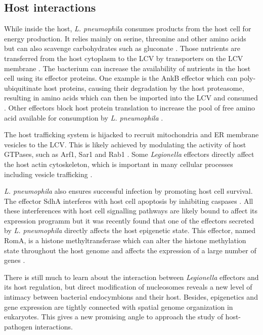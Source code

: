 \subsection{Host interactions}

While inside the host, \textit{L. pneumophila} consumes products from the host cell for energy production. It relies mainly on serine, threonine and other amino acids but can also scavenge carbohydrates such as gluconate \cite{bruggemannVirulenceStrategiesInfecting2006}. Those nutrients are transferred from the host cytoplasm to the LCV by transporters on the LCV membrane \cite{wielandIntracellularMultiplicationLegionella2005}. The bacterium can increase the availability of nutrients in the host cell using its effector proteins. One example is the AnkB effector which can poly-ubiquitinate host proteins, causing their degradation by the host proteasome, resulting in amino acids which can then be imported into the LCV and consumed \cite{priceMolecularMimicryFBox2009}.
Other effectors block host protein translation to increase the pool of free amino acid available for consumption by \textit{L. pneumophila} \cite{leonPositiveNegativeRegulation2017}.

The host trafficking system is hijacked to recruit mitochondria and \acrfull{ER} membrane vesicles to the LCV. This is likely achieved by modulating the activity of host GTPases, such as Arf1, Sar1 and Rab1 \cite{isbergLegionellaPneumophilaReplication2009}. Some \textit{Legionella} effectors directly affect the host actin cytoskeleton, which is important in many cellular processes including vesicle trafficking \citep{liuLegionellaEffectorDisrupts2017,francoLegionellaPneumophilaEffector2012}.

\textit{L. pneumophila} also ensures successful infection by promoting host cell survival. The effector SdhA interferes with host cell apoptosis by inhibiting caspases \cite{lagunaLegionellaPneumophilatranslocatedSubstrate2006}. All these interferences with host cell signalling pathways are likely bound to affect its expression programm but it was recently found that one of the effectors secreted by \textit{L. pneumophila} directly affects the host epigenetic state. This effector, named RomA, is a histone methyltransferase which can alter the histone methylation state throughout the host genome and affects the expression of a large number of genes \cite{rolandoLegionellaPneumophilaEffector2013}.

There is still much to learn about the interaction between \textit{Legionella} effectors and its host regulation, but direct modification of nucleosomes reveals a new level of intimacy between bacterial endocymbions and their host. Besides, epigenetics and gene expression are tightly connected with spatial genome organization in eukaryotes. This gives a new promising angle to approach the study of host-pathogen interactions.

